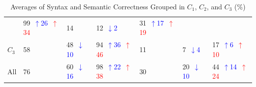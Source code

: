 \begin{table}
\begin{tabularx}{\textwidth}{l X X X X X X}
& 99~\textcolor{blue}{\scriptsize$\uparrow$26}~\textcolor{red}{\scriptsize$\uparrow$34}
& 14 
& 12~\textcolor{blue}{\scriptsize$\downarrow$2}   
& 31~\textcolor{blue}{\scriptsize$\uparrow$17}~\textcolor{red}{\scriptsize$\uparrow$19} \\
$C_3$ 
& 58 
& 48~\textcolor{blue}{\scriptsize$\downarrow$10}   
& 94~\textcolor{blue}{\scriptsize$\uparrow$36}~\textcolor{red}{\scriptsize$\uparrow$46}
& 11 
& 7~\textcolor{blue}{\scriptsize$\downarrow$4}   
& 17~\textcolor{blue}{\scriptsize$\uparrow$6}~\textcolor{red}{\scriptsize$\uparrow$10} \\
All 
& 76 
& 60~\textcolor{blue}{\scriptsize$\downarrow$16}   
& 98~\textcolor{blue}{\scriptsize$\uparrow$22}~\textcolor{red}{\scriptsize$\uparrow$38}
& 30 
& 20~\textcolor{blue}{\scriptsize$\downarrow$10}   
& 44~\textcolor{blue}{\scriptsize$\uparrow$14}~\textcolor{red}{\scriptsize$\uparrow$24} \\
\bottomrule
\end{tabularx}
\caption{Averages of Syntax and Semantic Correctness Grouped in $C_1$, $C_2$, and $C_3$ (\%)}
\label{tab:nonterminals_results}
\end{table}



